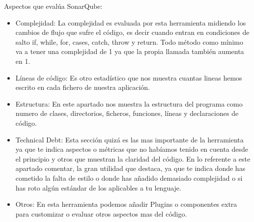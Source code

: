 Aspectos que evalúa SonarQube:
\begin{itemize}
	\item Complejidad: La complejidad es evaluada por esta herramienta midiendo los cambios de flujo que sufre el código, es decir cuando entran en condiciones de salto if, while, for, cases, catch, throw y return. Todo método como mínimo va a tener una complejidad de 1 ya que la propia llamada también aumenta en 1.
	\item Líneas de código: Es otro estadístico que nos muestra cuantas lineas hemos escrito en cada fichero de nuestra aplicación.
	\item Estructura: En este apartado nos muestra la estructura del programa como numero de clases, directorios, ficheros, funciones, líneas y declaraciones de código.
	\item Technical Debt: Esta sección quizá es las mas importante de la herramienta ya que te indica aspectos o métricas que no habíamos tenido en cuenta desde el principio y otros que muestran la claridad del código.
	En lo referente a este apartado comentar, la gran utilidad que destaca, ya que te indica donde has cometido la falta de estilo o donde has añadido demasiado complejidad o si has roto algún estándar de los aplicables a tu lenguaje.
	\item Otros: En esta herramienta podemos añadir Plugins o componentes extra para customizar o evaluar otros aspectos mas del código.
\end{itemize}